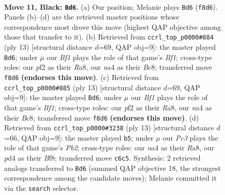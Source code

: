 \documentclass[11pt]{article}
\begin{document}
\clearpage

\begin{figure}[p]\centering
\begin{subfigure}{0.46\textwidth}\centering
\resizebox{\linewidth}{!}{%
\newchessgame
\chessboard[
  setfen={r1bqkb1r/p2n1ppp/2p1pn2/8/Np1P3N/4P3/PP2BPPP/R1BQ1RK1 b - - 3 11},
  showmover=false,
  pgfstyle=straightmove, color=movearrow, markmove={f8-d6}
]}
\caption{}
\end{subfigure}\hfill
\begin{subfigure}{0.46\textwidth}\centering
\resizebox{\linewidth}{!}{%
\newchessgame
\chessboard[
  setfen={r1bqkb1r/pp1n1ppp/2p1pn2/8/2PP4/2N2N2/PP3PPP/R1BQKB1R b KQkq - 2 7},
  showmover=false,
  pgfstyle=straightmove, color=movearrow, markmove={f8-d6}
]}
\caption{}
\end{subfigure}
\\[4pt]
\begin{subfigure}{0.46\textwidth}\centering
\resizebox{\linewidth}{!}{%
\newchessgame
\chessboard[
  setfen={r1bqkb1r/pp1n1ppp/2p1pn2/8/2PP4/2N2N2/PP3PPP/R1BQKB1R b KQkq - 2 7},
  showmover=false,
  pgfstyle=straightmove, color=movearrow, markmove={f8-d6}
]}
\caption{}
\end{subfigure}\hfill
\begin{subfigure}{0.46\textwidth}\centering
\resizebox{\linewidth}{!}{%
\newchessgame
\chessboard[
  setfen={r1bqkb1r/pp1n1ppp/2p1pn2/8/2NP4/2N3P1/PP2PP1P/R1BQKB1R b KQkq - 0 7},
  showmover=false,
  pgfstyle=straightmove, color=movearrow, markmove={b7-b5}
]}
\caption{}
\end{subfigure}
\caption{\textbf{Move 11, Black: \texttt{Bd6}.} (a) Our position; Melanie plays \texttt{Bd6} (\texttt{f8d6}). Panels (b)--(d) are the retrieved master positions whose correspondence most drove this move (highest QAP objective among those that transfer to it). (b) Retrieved from \texttt{ccrl\_top\_p0000\#884} (ply 13) [structural distance $d$=69, QAP obj=9]: the master played \texttt{Bd6}; under $\mu$ our \emph{Bf1} plays the role of that game's \emph{Bf1}; cross-type roles: our \emph{p}f2 as their \emph{R}a8, our \emph{n}a4 as their \emph{B}c8; transferred move \texttt{f8d6} \textbf{(endorses this move)}. (c) Retrieved from \texttt{ccrl\_top\_p0000\#885} (ply 13) [structural distance $d$=69, QAP obj=9]: the master played \texttt{Bd6}; under $\mu$ our \emph{Bf1} plays the role of that game's \emph{Bf1}; cross-type roles: our \emph{p}f2 as their \emph{R}a8, our \emph{n}a4 as their \emph{B}c8; transferred move \texttt{f8d6} \textbf{(endorses this move)}. (d) Retrieved from \texttt{ccrl\_top\_p0000\#3238} (ply 13) [structural distance $d$=66, QAP obj=9]: the master played \texttt{b5}; under $\mu$ our \emph{Pc3} plays the role of that game's \emph{Pb2}; cross-type roles: our \emph{n}a4 as their \emph{R}a8, our \emph{p}d4 as their \emph{B}f8; transferred move \texttt{c6c5}. Synthesis: 2 retrieved analogs transferred to \texttt{Bd6} (summed QAP objective 18, the strongest correspondence among the candidate moves); Melanie committed it via the \texttt{search} selector.}
\label{fig:thought-m21}
\end{figure}
\end{document}
